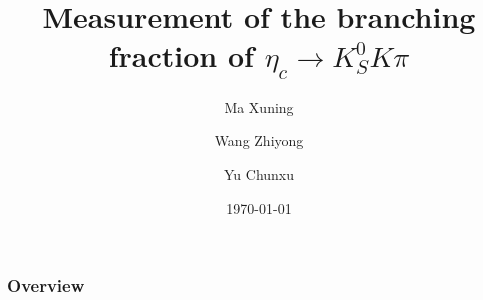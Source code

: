 \documentclass{beamer}
\title[Measurement of Branching fraction]{Measurement of the branching fraction of $\eta_c\to K_S^0 K \pi$} %
\author{Ma Xuning \inst{1} \and Wang Zhiyong\inst{2} \and Yu Chunxu \inst{1}} %
\institute[]{\inst{1} Nankai Univ. \and \inst{2} IHEP}
\date{\today} %
\begin{document}
\begin{frame}
    \titlepage %
\end{frame}

\begin{frame}
    \frametitle{Overview} %
    \setcounter{tocdepth}{1}
    \tableofcontents %
\end{frame}

\end{document}
